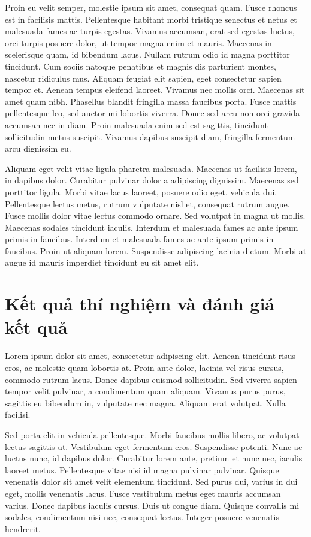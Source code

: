 Proin eu velit semper, molestie ipsum sit amet, consequat quam. Fusce rhoncus est in facilisis mattis. Pellentesque habitant morbi tristique senectus et netus et malesuada fames ac turpis egestas. Vivamus accumsan, erat sed egestas luctus, orci turpis posuere dolor, ut tempor magna enim et mauris. Maecenas in scelerisque quam, id bibendum lacus. Nullam rutrum odio id magna porttitor tincidunt. Cum sociis natoque penatibus et magnis dis parturient montes, nascetur ridiculus mus. Aliquam feugiat elit sapien, eget consectetur sapien tempor et. Aenean tempus eleifend laoreet. Vivamus nec mollis orci. Maecenas sit amet quam nibh. Phasellus blandit fringilla massa faucibus porta. Fusce mattis pellentesque leo, sed auctor mi lobortis viverra. Donec sed arcu non orci gravida accumsan nec in diam. Proin malesuada enim sed est sagittis, tincidunt sollicitudin metus suscipit. Vivamus dapibus suscipit diam, fringilla fermentum arcu dignissim eu.

Aliquam eget velit vitae ligula pharetra malesuada. Maecenas ut facilisis lorem, in dapibus dolor. Curabitur pulvinar dolor a adipiscing dignissim. Maecenas sed porttitor ligula. Morbi vitae lacus laoreet, posuere odio eget, vehicula dui. Pellentesque lectus metus, rutrum vulputate nisl et, consequat rutrum augue. Fusce mollis dolor vitae lectus commodo ornare. Sed volutpat in magna ut mollis. Maecenas sodales tincidunt iaculis. Interdum et malesuada fames ac ante ipsum primis in faucibus. Interdum et malesuada fames ac ante ipsum primis in faucibus. Proin ut aliquam lorem. Suspendisse adipiscing lacinia dictum. Morbi at augue id mauris imperdiet tincidunt eu sit amet elit.

\section{Kết quả thí nghiệm và đánh giá kết quả}
Lorem ipsum dolor sit amet, consectetur adipiscing elit. Aenean tincidunt risus eros, ac molestie quam lobortis at. Proin ante dolor, lacinia vel risus cursus, commodo rutrum lacus. Donec dapibus euismod sollicitudin. Sed viverra sapien tempor velit pulvinar, a condimentum quam aliquam. Vivamus purus purus, sagittis eu bibendum in, vulputate nec magna. Aliquam erat volutpat. Nulla facilisi.

Sed porta elit in vehicula pellentesque. Morbi faucibus mollis libero, ac volutpat lectus sagittis ut. Vestibulum eget fermentum eros. Suspendisse potenti. Nunc ac luctus nunc, id dapibus dolor. Curabitur lorem ante, pretium et nunc nec, iaculis laoreet metus. Pellentesque vitae nisi id magna pulvinar pulvinar. Quisque venenatis dolor sit amet velit elementum tincidunt. Sed purus dui, varius in dui eget, mollis venenatis lacus. Fusce vestibulum metus eget mauris accumsan varius. Donec dapibus iaculis cursus. Duis ut congue diam. Quisque convallis mi sodales, condimentum nisi nec, consequat lectus. Integer posuere venenatis hendrerit.
